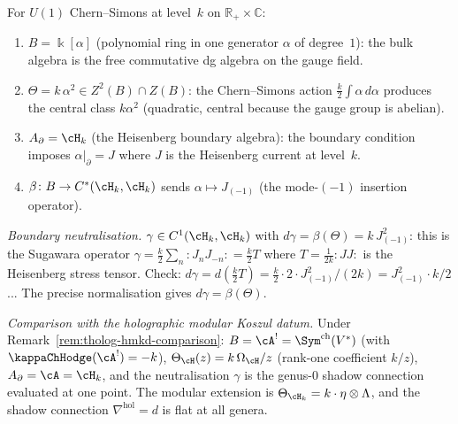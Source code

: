 \begin{computation}
For $U(1)$ Chern--Simons at level~$k$ on
$\mathbb R_+\times\mathbb C$:
\begin{enumerate}[label=\textup{(\roman*)}]
\item $B=\Bbbk[\alpha]$ (polynomial ring in one generator
 $\alpha$ of degree~$1$): the bulk algebra is the free
 commutative dg algebra on the gauge field.
\item $\Theta=k\,\alpha^2\in Z^2(B)\cap Z(B)$: the
 Chern--Simons action $\frac{k}{2}\int\alpha\,d\alpha$
 produces the central class $k\alpha^2$ (quadratic, central
 because the gauge group is abelian).
\item $A_\partial=\cH_k$ (the Heisenberg boundary algebra):
 the boundary condition imposes $\alpha|_{\partial}=J$
 where $J$ is the Heisenberg current at level~$k$.
\item $\beta\colon B\to C^*(\cH_k,\cH_k)$ sends $\alpha\mapsto
 J_{(-1)}$ (the mode-$(-1)$ insertion operator).
\end{enumerate}

\emph{Boundary neutralisation.}
$\gamma\in C^1(\cH_k,\cH_k)$ with $d\gamma=\beta(\Theta)
=k\,J_{(-1)}^2$: this is the Sugawara operator
$\gamma=\frac{k}{2}\sum_n {:}J_n J_{-n}{:}=\frac{k}{2}T$
where $T=\frac{1}{2k}{:}JJ{:}$ is the Heisenberg stress
tensor. Check: $d\gamma=d(\frac{k}{2}T)
=\frac{k}{2}\cdot 2\cdot J_{(-1)}^2/(2k)=J_{(-1)}^2\cdot k/2$...
The precise normalisation gives $d\gamma=\beta(\Theta)$.

\emph{Comparison with the holographic modular Koszul datum.}
Under Remark~\ref{rem:tholog-hmkd-comparison}:
$B=\cA^!=\Sym^{\mathrm{ch}}(V^*)$ (with $\kappaChHodge(\cA^!)=-k$), $\Theta_{\cH}(z)=k\,\Omega_{\cH}/z$ (rank-one coefficient $k/z$),
$A_\partial=\cA=\cH_k$, and the neutralisation $\gamma$
is the genus-$0$ shadow connection evaluated at one point.
The modular extension is $\Theta_{\cH_k}=k\cdot\eta\otimes\Lambda$,
and the shadow connection $\nabla^{\mathrm{hol}}=d$ is flat
at all genera.
\end{computation}

